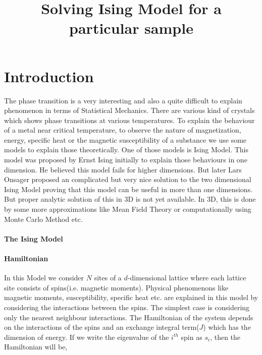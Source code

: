 \documentclass[20pt]{article}
\begin{document}
\title{{\LARGE \textbf{Solving Ising Model for a particular sample}}}
\author{}
\date{}
\maketitle
\section{{\Large Introduction\\}}
The phase transition is a very interesting and also a quite difficult to explain phenomenon in terms of Statistical Mechanics. There are various kind of crystals which shows phase transitions at various temperatures. To explain the behaviour of a metal near critical temperature, to observe the nature of magnetization, energy, specific heat or the magnetic susceptibility of a substance we use some models to explain those theoretically. One of those models is Ising Model. This model was proposed by Ernst Ising initially to explain those behaviours in one dimension. He believed this model fails for higher dimensions. But later Lars Onsager proposed an complicated but very nice solution to the two dimensional Ising Model proving that this model can be useful in more than one dimensions. But proper analytic solution of this in 3D is not yet available. In 3D, this is done by some more approximations like Mean Field Theory or computationally using Monte Carlo Method etc.   \\
\paragraph*{{\large The Ising Model}}
\paragraph*{Hamiltonian\\}

In this Model we consider $N$ sites of a $d$-dimensional lattice where each lattice site consists of spins(i.e. magnetic moments). Physical phenomenons like magnetic moments, susceptibility, specific heat etc. are explained in this model by considering the interactions between the spins. The simplest case is considering only the nearest  neighbour interactions. The Hamiltonian of the system depends on the interactions of the spins and an exchange integral term($J$) which has the dimension of energy. If we write the eigenvalue of the $i^{th}$ spin as $s_i$, then the Hamiltonian will be,\\
\end{document}
